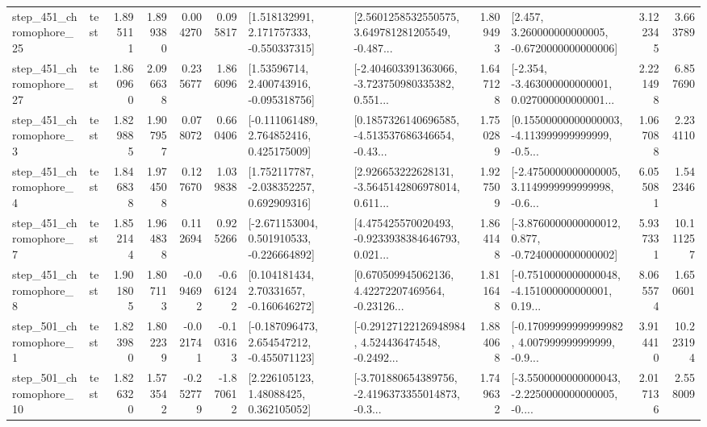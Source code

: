\begin{tabular}{llrrrrllrlrr}
  step\_451\_chromophore\_25 &      test &      1.895111 &    1.899380 &      0.004270 &  0.095817 &    [1.518132991, 2.171757333, -0.550337315] &  [2.5601258532550575, 3.649781281205549, -0.487... &       1.809493 &    [2.457, 3.260000000000005, -0.6720000000000006] &            3.122345 &          3.663789 \\
  step\_451\_chromophore\_27 &      test &      1.860960 &    2.096638 &      0.235677 &  1.866096 &     [1.53596714, 2.400743916, -0.095318756] &  [-2.404603391363066, -3.723750980335382, 0.551... &       1.647128 &  [-2.354, -3.463000000000001, 0.027000000000001... &            2.221498 &          6.857690 \\
   step\_451\_chromophore\_3 &      test &      1.829885 &    1.907957 &      0.078072 &  0.660406 &    [-0.111061489, 2.764852416, 0.425175009] &  [0.1857326140696585, -4.513537686346654, -0.43... &       1.750289 &  [0.15500000000000003, -4.113999999999999, -0.5... &            1.067088 &          2.234110 \\
   step\_451\_chromophore\_4 &      test &      1.846838 &    1.974508 &      0.127670 &  1.039838 &    [1.752117787, -2.038352257, 0.692909316] &  [2.926653222628131, -3.5645142806978014, 0.611... &       1.927509 &  [-2.4750000000000005, 3.1149999999999998, -0.6... &            6.055081 &          1.542346 \\
   step\_451\_chromophore\_7 &      test &      1.852144 &    1.964838 &      0.112694 &  0.925266 &   [-2.671153004, 0.501910533, -0.226664892] &  [4.475425570020493, -0.9233938384646793, 0.021... &       1.864148 &  [-3.8760000000000012, 0.877, -0.7240000000000002] &            5.937331 &         10.111257 \\
   step\_451\_chromophore\_8 &      test &      1.901805 &    1.807113 &     -0.094692 & -0.661242 &     [0.104181434, 2.70331657, -0.160646272] &  [0.670509945062136, 4.42272207469564, -0.23126... &       1.811648 &  [-0.7510000000000048, -4.151000000000001, 0.19... &            8.065574 &          1.650601 \\
   step\_501\_chromophore\_1 &      test &      1.823980 &    1.802239 &     -0.021741 & -0.103163 &   [-0.187096473, 2.654547212, -0.455071123] &  [-0.29127122126948984, 4.524436474548, -0.2492... &       1.884068 &  [-0.17099999999999982, 4.007999999999999, -0.9... &            3.914410 &         10.223194 \\
  step\_501\_chromophore\_10 &      test &      1.826320 &    1.573542 &     -0.252779 & -1.870612 &      [2.226105123, 1.48088425, 0.362105052] &  [-3.701880654389756, -2.4196373355014873, -0.3... &       1.749632 &  [-3.5500000000000043, -2.2250000000000005, -0.... &            2.017136 &          2.558009 \\

\end{tabular}
